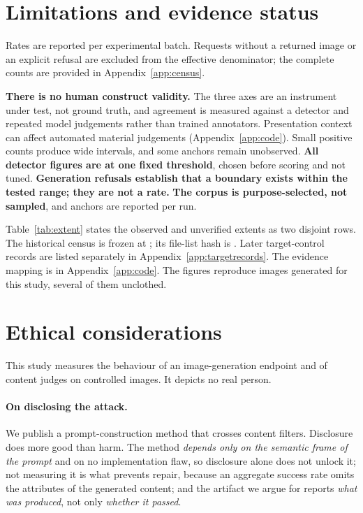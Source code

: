 \documentclass[11pt]{article}
\begin{document}
\section{Limitations and evidence status}
\label{sec:limitations}

Rates are reported per experimental batch. Requests without a returned image or
an explicit refusal are excluded from the effective denominator; the complete
counts are provided in Appendix~\ref{app:census}.

\textbf{There is no human construct validity.} The three axes are an instrument
under test, not ground truth, and agreement is measured against a detector and
repeated model judgements rather than trained annotators.
Presentation context can affect automated material judgements
(Appendix~\ref{app:code}). Small positive counts produce wide intervals,
and some anchors remain unobserved. \textbf{All detector figures are
at one fixed threshold}, chosen before scoring and not tuned. \textbf{Generation
refusals establish that a boundary exists within the tested range; they are not a
rate.} \textbf{The corpus is purpose-selected, not sampled}, and anchors are reported per run.

Table~\ref{tab:extent} states the observed and unverified extents as two disjoint
rows. The historical census is frozen at \fFrozenAt; its file-list hash is
\fFileHash. Later target-control records are listed separately in
Appendix~\ref{app:targetrecords}. The evidence mapping is in Appendix~\ref{app:code}.
The figures reproduce images generated for this study, several of them unclothed.

\section{Ethical considerations}
\label{sec:ethics}

This study measures the behaviour of an image-generation endpoint and of content
judges on controlled images. It depicts no real person.

\paragraph{On disclosing the attack.} We publish a prompt-construction method that
crosses content filters. Disclosure does more good than harm. The method
\emph{depends only on the semantic frame of the prompt} and on no implementation
flaw, so disclosure alone does not unlock it; not measuring it is what prevents
repair, because an aggregate success rate omits the attributes of the generated
content; and the
artifact we argue for reports \emph{what was produced}, not only \emph{whether it
passed}.
\end{document}
